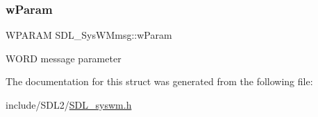 \subsubsection{\texorpdfstring{w\+Param}{wParam}}
{\footnotesize\ttfamily W\+P\+A\+R\+AM S\+D\+L\+\_\+\+Sys\+W\+Mmsg\+::w\+Param}

W\+O\+RD message parameter 

The documentation for this struct was generated from the following file\+:\begin{DoxyCompactItemize}
\item 
include/\+S\+D\+L2/\hyperlink{_s_d_l__syswm_8h}{S\+D\+L\+\_\+syswm.\+h}\end{DoxyCompactItemize}
